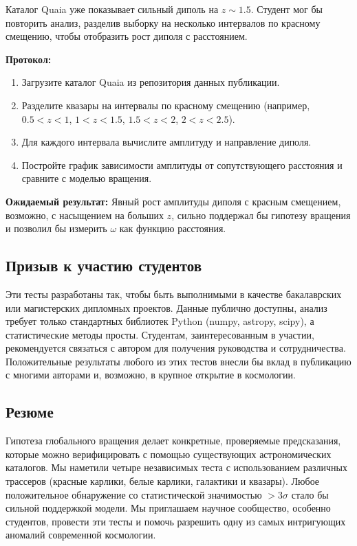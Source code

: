 \documentclass[11pt,a4paper]{article}
\begin{document}
	Каталог Quaia \cite{Secrest2025} уже показывает сильный диполь на \(z\sim1.5\). Студент мог бы повторить анализ, разделив выборку на несколько интервалов по красному смещению, чтобы отобразить рост диполя с расстоянием.
	
	\textbf{Протокол:}
	\begin{enumerate}
		\item Загрузите каталог Quaia из репозитория данных публикации.
		\item Разделите квазары на интервалы по красному смещению (например, \(0.5<z<1\), \(1<z<1.5\), \(1.5<z<2\), \(2<z<2.5\)).
		\item Для каждого интервала вычислите амплитуду и направление диполя.
		\item Постройте график зависимости амплитуды от сопутствующего расстояния и сравните с моделью вращения.
	\end{enumerate}
	
	\textbf{Ожидаемый результат:} Явный рост амплитуды диполя с красным смещением, возможно, с насыщением на больших \(z\), сильно поддержал бы гипотезу вращения и позволил бы измерить \(\omega\) как функцию расстояния.
	
	\subsection{Призыв к участию студентов}
	
	Эти тесты разработаны так, чтобы быть выполнимыми в качестве бакалаврских или магистерских дипломных проектов. Данные публично доступны, анализ требует только стандартных библиотек Python (numpy, astropy, scipy), а статистические методы просты. Студентам, заинтересованным в участии, рекомендуется связаться с автором для получения руководства и сотрудничества. Положительные результаты любого из этих тестов внесли бы вклад в публикацию с многими авторами и, возможно, в крупное открытие в космологии.
	
	\subsection{Резюме}
	
	Гипотеза глобального вращения делает конкретные, проверяемые предсказания, которые можно верифицировать с помощью существующих астрономических каталогов. Мы наметили четыре независимых теста с использованием различных трассеров (красные карлики, белые карлики, галактики и квазары). Любое положительное обнаружение со статистической значимостью \(>3\sigma\) стало бы сильной поддержкой модели. Мы приглашаем научное сообщество, особенно студентов, провести эти тесты и помочь разрешить одну из самых интригующих аномалий современной космологии.
	
\end{document}
